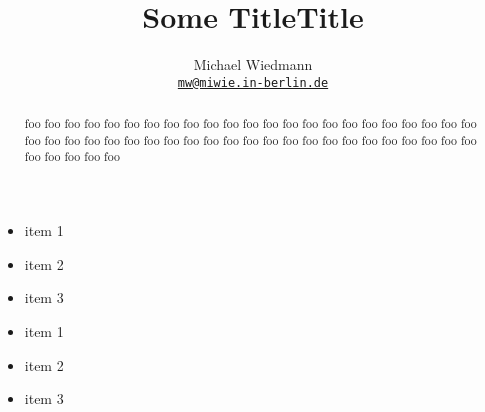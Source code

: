 \documentclass[a4paper,11pt]{article}
\begin{document}
\begin{screen}
\title{\color{section0}\Huge Some Title}
\end{screen}

\begin{print}
\title{\HugeSome Title}
\end{print}

\author{\color{section1}\Large Michael Wiedmann\\
        {\small\href{mailto:mw@miwie.in-berlin.de}
        {\color{section1}\texttt{mw@miwie.in-berlin.de}}}}
\maketitle
\begin{screen}
\vfill
\end{screen}

\begin{abstract}
\noindent
foo foo foo foo foo foo foo foo foo foo foo foo foo foo foo foo foo 
foo foo foo foo foo foo foo foo foo foo foo foo foo foo foo foo foo 
foo foo foo foo foo foo foo foo foo foo foo foo foo foo foo foo foo 
\lipsum*[1]
\end{abstract}
                                                                  
\begin{print}
\tableofcontents
\end{print}
\begin{screen}
\vfill                                                                  
\end{screen}

\begin{slide}
\lipsum[2]

\begin{itemize}
\item item 1
\item item 2
\item item 3
\end{itemize}

\end{slide}


\begin{slide}
\lipsum[3]
\begin{itemize}
\item  item 1
\item  item 2
\item  item 3
\end{itemize}

\end{slide}
\end{document}
